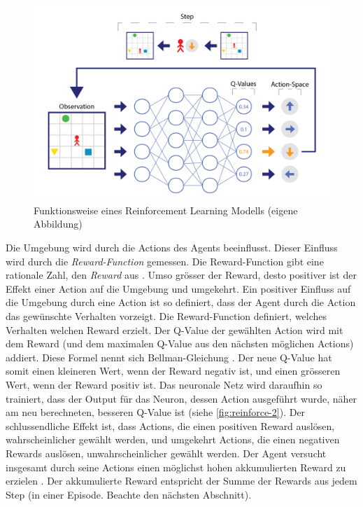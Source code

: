 \begin{figure}[!ht]
   \centering
   \includegraphics[width=\textwidth]{images/theorie/reinforce-1.png}
   \caption{Funktionsweise eines Reinforcement Learning Modells (eigene Abbildung)}\label{fig:reinforce-1}
\end{figure}
 
Die Umgebung wird durch die Actions des Agents beeinflusst. Dieser Einfluss wird
durch die \emph{Reward-Function} gemessen. Die Reward-Function gibt eine
rationale Zahl, den \emph{Reward} aus \cite[S. 75]{sutton_reinforcement_2014}.
Umso grösser der Reward, desto positiver ist der Effekt einer Action auf die
Umgebung und umgekehrt. Ein positiver Einfluss auf die Umgebung durch eine
Action ist so definiert, dass der Agent durch die Action das gewünschte
Verhalten vorzeigt. Die Reward-Function definiert, welches Verhalten welchen
Reward erzielt. Der Q-Value der gewählten Action wird mit dem Reward (und dem
maximalen Q-Value aus den nächsten möglichen Actions) addiert. Diese Formel
nennt sich Bellman-Gleichung \cite[S. 3]{mnih_playing_2013}. Der neue Q-Value
hat somit einen kleineren Wert, wenn der Reward negativ ist, und einen grösseren
Wert, wenn der Reward positiv ist. Das neuronale Netz wird daraufhin so
trainiert, dass der Output für das Neuron, dessen Action ausgeführt wurde, näher
am neu berechneten, besseren Q-Value ist (siehe \autoref{fig:reinforce-2}). Der
schlussendliche Effekt ist, dass Actions, die einen positiven Reward auslösen,
wahrscheinlicher gewählt werden, und umgekehrt Actions, die einen negativen
Rewards auslösen, unwahrscheinlicher gewählt werden. Der Agent versucht
insgesamt durch seine Actions einen möglichst hohen akkumulierten Reward zu
erzielen \cite[S. 57]{sutton_reinforcement_2014}. Der akkumulierte Reward
entspricht der Summe der Rewards aus jedem Step (in einer Episode. Beachte den
nächsten Abschnitt).
 

